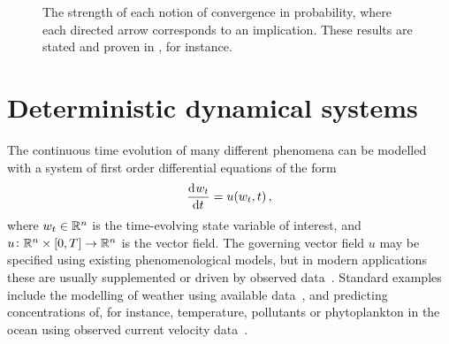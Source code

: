 \usetikzlibrary{positioning}
\begin{figure}
	\begin{center}
		\caption{The strength of each notion of convergence in probability, where each directed arrow corresponds to an implication.
			These results are stated and proven in \citet{Bremaud_2020_ProbabilityTheoryStochastic}, for instance.}
		\label{fig:rv_conv_impl}
	\end{center}
\end{figure}







\section{Deterministic dynamical systems}
The continuous time evolution of many different phenomena can be modelled with a system of first order differential equations of the form
\begin{equation}\label{eqn:det_ode}
	\dod{w_t}{t} = u\!\left(w_t, t\right),
\end{equation}
where \(w_t \in \mathbb{R}^n\) is the time-evolving state variable of interest, and \(u \colon \mathbb{R}^n \times [0,T] \to \mathbb{R}^n\) is the vector field.
The governing vector field \(u\) may be specified using existing phenomenological models, but in modern applications these are usually supplemented or driven by observed data~\citep{LawEtAl_2015_DataAssimilationMathematical,ReichCotter_2015_ProbabilisticForecastingBayesian}.
Standard examples include the modelling of weather using available data~\citep{LawEtAl_2015_DataAssimilationMathematical,ReichCotter_2015_ProbabilisticForecastingBayesian}, and predicting concentrations of, for instance, temperature, pollutants or phytoplankton in the ocean using observed current velocity data~\citep{AbascalEtAl_2009_ApplicationHFRadar,dOvidioEtAl_2010_FluidDynamicalNiches}.


